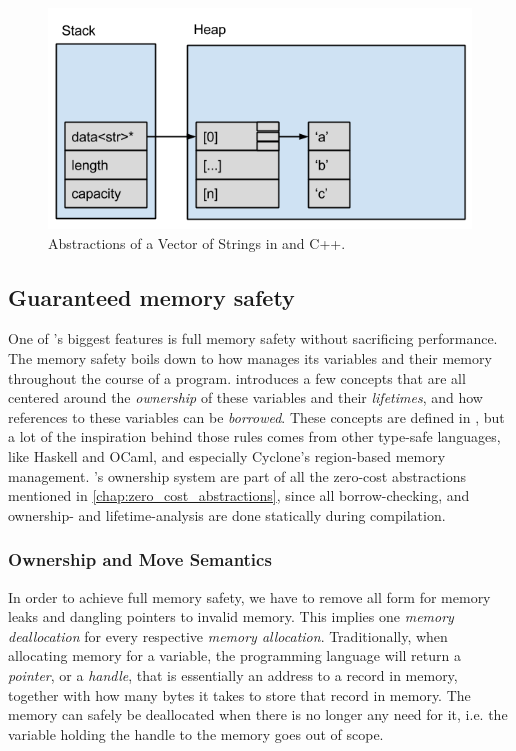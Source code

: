 \begin{figure}[tb]
  \begin{center}
    \includegraphics[scale=0.5]{figures/cpp_abstractions}
  \end{center}
  \caption{Abstractions of a Vector of Strings in \rust and C++.}
  \label{fig:cpp_abstractions}
\end{figure}

\subsection{Guaranteed memory safety}
\label{sec:guaranteed_memory_safety}

One of \rust's biggest features is full memory safety \cite{web:rust_book_unsafe} without sacrificing performance.
The memory safety boils down to how \rust manages its variables and their memory throughout the course of a program.
\rust introduces a few concepts that are all centered around the \emph{ownership} of these variables and their \emph{lifetimes}, and how references to these variables can be \emph{borrowed}.
These concepts are defined in \rust, but a lot of the inspiration behind those rules comes from other type-safe languages, like Haskell and OCaml, and especially Cyclone's \cite{Grossman2002,Swamy2006} region-based memory management.
\rust's ownership system are part of all the zero-cost abstractions mentioned in \autoref{chap:zero_cost_abstractions}, since all borrow-checking, and ownership- and lifetime-analysis are done statically during compilation.

\subsubsection{Ownership and Move Semantics}
\label{sec:back:rust:own}

In order to achieve full memory safety, we have to remove all form for memory leaks and dangling pointers to invalid memory.
This implies one \emph{memory deallocation} for every respective \emph{memory allocation}.
Traditionally, when allocating memory for a variable, the programming language will return a \emph{pointer},  or a \emph{handle}, that is essentially an address to a record in memory, together with how many bytes it takes to store that record in memory.
The memory can safely be deallocated when there is no longer any need for it, i.e. the variable holding the handle to the memory goes out of scope.

